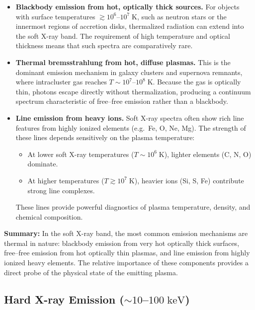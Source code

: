 \begin{itemize}
    \item \textbf{Blackbody emission from hot, optically thick sources.}
    For objects with surface temperatures $\gtrsim 10^6$--$10^7\;\mathrm{K}$,
    such as neutron stars or the innermost regions of accretion disks,
    thermalized radiation can extend into the soft X-ray band. The
    requirement of high temperature and optical thickness means that
    such spectra are comparatively rare.

    \item \textbf{Thermal bremsstrahlung from hot, diffuse plasmas.}
    This is the dominant emission mechanism in galaxy clusters and
    supernova remnants, where intracluster gas reaches
    $T \sim 10^7$--$10^8\;\mathrm{K}$. Because the gas is optically
    thin, photons escape directly without thermalization, producing a
    continuum spectrum characteristic of free--free emission rather than
    a blackbody.

    \item \textbf{Line emission from heavy ions.}
    Soft X-ray spectra often show rich line features from
    highly ionized elements (e.g.~Fe, O, Ne, Mg). The strength of these
    lines depends sensitively on the plasma temperature:
    \begin{itemize}
        \item At lower soft X-ray temperatures ($T \sim 10^6\;\mathrm{K}$),
              lighter elements (C, N, O) dominate.
        \item At higher temperatures ($T \gtrsim 10^7\;\mathrm{K}$),
              heavier ions (Si, S, Fe) contribute strong line complexes.
    \end{itemize}
    These lines provide powerful diagnostics of plasma temperature,
    density, and chemical composition.
\end{itemize}

\begin{remark}
    \textbf{Summary:} In the soft X-ray band, the most common emission
    mechanisms are thermal in nature: blackbody emission from very hot
    optically thick surfaces, free--free emission from hot optically
    thin plasmas, and line emission from highly ionized heavy elements.
    The relative importance of these components provides a direct probe
    of the physical state of the emitting plasma.
\end{remark}

\subsection{Hard X-ray Emission ($\sim 10$--$100\;\mathrm{keV}$)}

